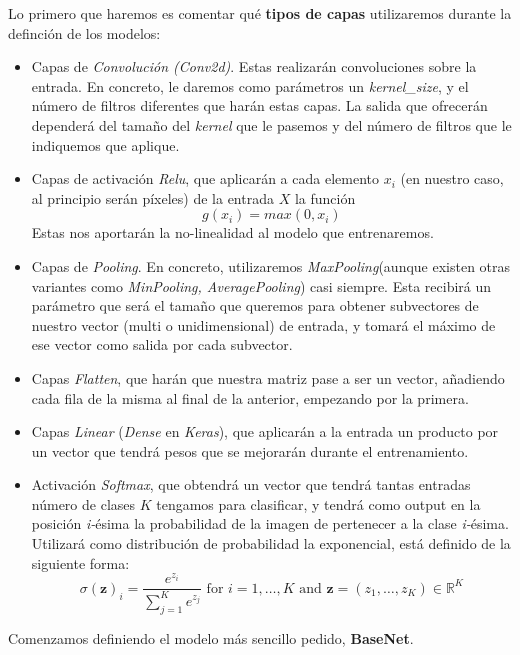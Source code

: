 \documentclass[11pt]{article}
\begin{document}
Lo primero que haremos es comentar qué \textbf{tipos de capas}
utilizaremos durante la definción de los modelos:

\begin{itemize}
\item
  Capas de \emph{Convolución (Conv2d)}. Estas realizarán convoluciones
  sobre la entrada. En concreto, le daremos como parámetros un
  \emph{kernel\_size}, y el número de filtros diferentes que harán estas
  capas. La salida que ofrecerán dependerá del tamaño del \emph{kernel}
  que le pasemos y del número de filtros que le indiquemos que aplique.
\item
  Capas de activación \emph{Relu}, que aplicarán a cada elemento \(x_i\)
  (en nuestro caso, al principio serán píxeles) de la entrada \(X\) la
  función \[
  g(x_i) = max(0,x_i)
  \] Estas nos aportarán la no-linealidad al modelo que entrenaremos.
\item
  Capas de \emph{Pooling}. En concreto, utilizaremos
  \emph{MaxPooling}(aunque existen otras variantes como
  \emph{MinPooling, AveragePooling}) casi siempre. Esta recibirá un
  parámetro que será el tamaño que queremos para obtener subvectores de
  nuestro vector (multi o unidimensional) de entrada, y tomará el máximo
  de ese vector como salida por cada subvector.
\item
  Capas \emph{Flatten}, que harán que nuestra matriz pase a ser un
  vector, añadiendo cada fila de la misma al final de la anterior,
  empezando por la primera.
\item
  Capas \emph{Linear} (\emph{Dense} en \emph{Keras}), que aplicarán a la
  entrada un producto por un vector que tendrá pesos que se mejorarán
  durante el entrenamiento.
\item
  Activación \emph{Softmax}, que obtendrá un vector que tendrá tantas
  entradas número de clases \(K\) tengamos para clasificar, y tendrá
  como output en la posición \emph{i-}ésima la probabilidad de la imagen
  de pertenecer a la clase \emph{i-}ésima. Utilizará como distribución
  de probabilidad la exponencial, está definido de la siguiente forma:
  \[ 
  {\displaystyle \sigma (\mathbf {z} )_{i}={\frac {e^{z_{i}}}{\sum _{j=1}^{K}e^{z_{j}}}}{\text{ for }}i=1,\dotsc ,K{\text{ and }}\mathbf {z} =(z_{1},\dotsc ,z_{K})\in \mathbb {R} ^{K}}
  \]
\end{itemize}

Comenzamos definiendo el modelo más sencillo pedido, \textbf{BaseNet}.
\end{document}
